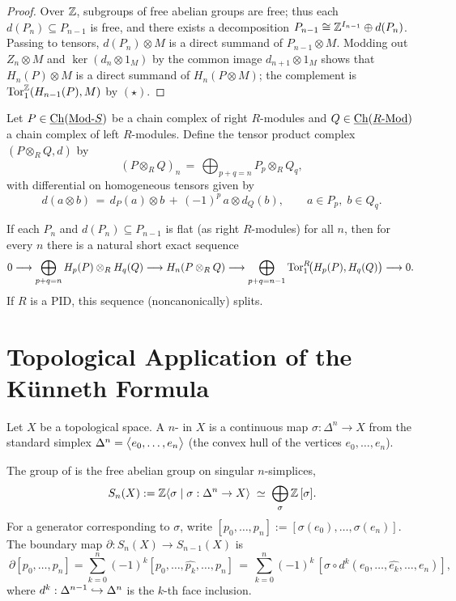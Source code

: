 \begin{proof}
	Over \( \mathbb{Z} \), subgroups of free abelian groups are free; thus each \( d(P_n)\subseteq P_{n-1} \) is free, and there exists a decomposition \( P_{n-1}\cong \mathbb{Z}^{I_{n-1}} \oplus d(P_n) \). Passing to tensors, \( d(P_n)\otimes M \) is a direct summand of \( P_{n-1}\otimes M \). Modding out \( Z_n\otimes M \) and \( \ker(d_n\otimes 1_M) \) by the common image \( d_{n+1}\otimes 1_M \) shows that \( H_n(P)\otimes M \) is a direct summand of \( H_n(P\otimes M) \); the complement is \( \operatorname{Tor}^{\mathbb{Z}}_1(H_{n-1}(P),M) \) by \( (\star) \).
\end{proof}

\begin{definition*}
	Let \( P \in \operatorname{\underline{\mathrm{Ch}}}(\underline{\mathrm{Mod}\text{-}S}) \) be a chain complex of right \( R \)-modules and \( Q \in \operatorname{\underline{\mathrm{Ch}}}(\underline{R\text{-}\mathrm{Mod}}) \) a chain complex of left \( R \)-modules. Define the tensor product complex \( (P\otimes_R Q, d) \) by
	\[
		\ (P\otimes_R Q)_n \,=\, \bigoplus_{p+q=n} P_p \otimes_R Q_q,
	\]
	with differential on homogeneous tensors given by
	\[
		\ d(a\otimes b) \,=\, d_P(a)\otimes b \, + \, (-1)^{p}\, a \otimes d_Q(b), \qquad a\in P_p,\; b\in Q_q.
	\]
\end{definition*}

\begin{theorem*}
	If each \( P_n \) and \( d(P_n)\subseteq P_{n-1} \) is flat (as right \( R \)-modules) for all \( n \), then for every \( n \) there is a natural short exact sequence
	\[
		0 \longrightarrow \bigoplus_{p+q=n} H_p(P)\otimes_R H_q(Q)
		\longrightarrow H_n(P\otimes_R Q)
		\longrightarrow \bigoplus_{p+q=n-1} \operatorname{Tor}^{R}_1\!\bigl(H_p(P), H_q(Q)\bigr)
		\longrightarrow 0 .
	\]
	If \( R \) is a PID, this sequence (noncanonically) splits.
\end{theorem*}

\section{Topological Application of the K\"unneth  Formula}

Let \( X \) be a topological space. A  \( n \)- in \( X \) is a continuous map \( \sigma: \Delta^{n} \to X \) from the standard simplex \( \Delta^{n} = \bigl\langle e_0,\dots,e_n \bigr\rangle \) (the convex hull of the vertices \( e_0,\dots,e_n \)).

\begin{definition*}
	The group of  is the free abelian group on singular \( n \)-simplices,
	\[
		\ S_n(X) := \mathbb{Z}\langle \sigma \mid \sigma: \Delta^n\to X \rangle \;\simeq\; \bigoplus_{\sigma} \mathbb{Z}\,[\sigma] .
	\]
	For a generator corresponding to \( \sigma \), write \( [p_0,\dots,p_n] := [\sigma(e_0),\dots,\sigma(e_n)] \). The boundary map \( \partial: S_n(X) \to S_{n-1}(X) \) is
	\[
		\ \partial[p_0,\dots,p_n] = \sum_{k=0}^{n} (-1)^k [p_0,\dots, \widehat{p_k},\dots,p_n] \,=\, \sum_{k=0}^{n} (-1)^k\, [\sigma\circ d^{k}(e_0,\dots,\widehat{e_k},\dots,e_n)],
	\]
	where \( d^{k}: \Delta^{n-1}\hookrightarrow \Delta^{n} \) is the \( k \)-th face inclusion.
\end{definition*}

